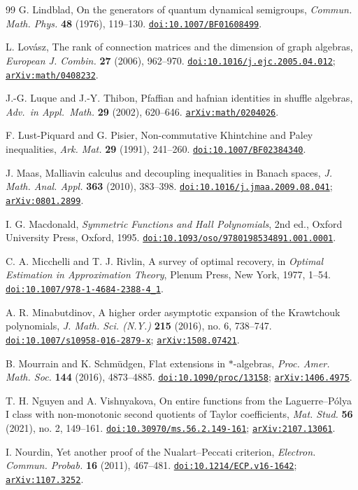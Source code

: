 \documentclass[11pt,a4paper]{amsart}
\numberwithin{equation}{section}
\theoremstyle{definition}
\theoremstyle{remark}
\newcommand{\arxiv}[1]{\href{https://arxiv.org/abs/#1}{\nolinkurl{arXiv:#1}}}
\newcommand{\doi}[1]{\href{https://doi.org/#1}{\nolinkurl{doi:#1}}}
\begin{document}
\begin{thebibliography}{99}
 G. Lindblad, On the generators of quantum dynamical semigroups,
\emph{Commun. Math. Phys.} \textbf{48} (1976), 119--130. \doi{10.1007/BF01608499}.

 L. Lov\'asz, The rank of connection matrices and the dimension of graph algebras,
\emph{European J. Combin.} \textbf{27} (2006), 962--970. \doi{10.1016/j.ejc.2005.04.012}; \arxiv{math/0408232}.

 J.-G. Luque and J.-Y. Thibon,
Pfaffian and hafnian identities in shuffle algebras,
\emph{Adv.\ in Appl.\ Math.} \textbf{29} (2002), 620--646.
\arxiv{math/0204026}.

 F. Lust-Piquard and G. Pisier, Non-commutative Khintchine and Paley inequalities,
\emph{Ark. Mat.} \textbf{29} (1991), 241--260. \doi{10.1007/BF02384340}.

 J. Maas, Malliavin calculus and decoupling inequalities in Banach spaces,
\emph{J. Math. Anal. Appl.} \textbf{363} (2010), 383--398.
\doi{10.1016/j.jmaa.2009.08.041}; \arxiv{0801.2899}.

 I. G. Macdonald,
\emph{Symmetric Functions and Hall Polynomials}, 2nd ed., Oxford University Press,
Oxford, 1995. \doi{10.1093/oso/9780198534891.001.0001}.

 C. A. Micchelli and T. J. Rivlin, A survey of optimal recovery,
in \emph{Optimal Estimation in Approximation Theory}, Plenum Press, New York, 1977, 1--54. \doi{10.1007/978-1-4684-2388-4_1}.

 A. R. Minabutdinov,
A higher order asymptotic expansion of the Krawtchouk polynomials,
\emph{J. Math. Sci. (N.Y.)} \textbf{215} (2016), no. 6, 738--747.
\doi{10.1007/s10958-016-2879-x}; \arxiv{1508.07421}.

 B. Mourrain and K. Schm\"udgen, Flat extensions in $*$-algebras,
\emph{Proc. Amer. Math. Soc.} \textbf{144} (2016), 4873--4885.
\doi{10.1090/proc/13158}; \arxiv{1406.4975}.

 T. H. Nguyen and A. Vishnyakova,
On entire functions from the Laguerre--P\'olya I class with non-monotonic second quotients of Taylor coefficients,
\emph{Mat. Stud.} \textbf{56} (2021), no. 2, 149--161.
\doi{10.30970/ms.56.2.149-161}; \arxiv{2107.13061}.

 I. Nourdin, Yet another proof of the Nualart--Peccati criterion,
\emph{Electron. Commun. Probab.} \textbf{16} (2011), 467--481.
\doi{10.1214/ECP.v16-1642}; \arxiv{1107.3252}.


\end{thebibliography}
\end{document}
